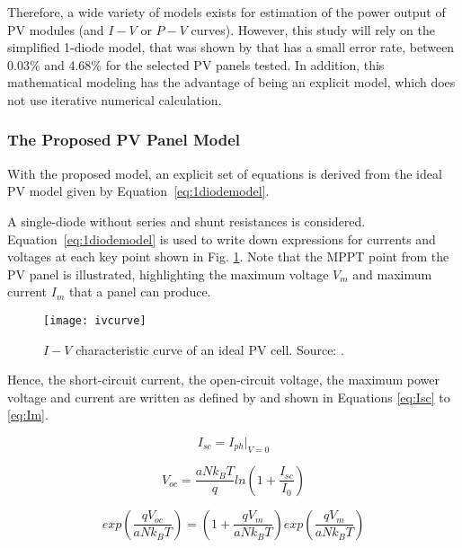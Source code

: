 Therefore, a wide variety of models exists for estimation of the power output of PV modules (and $I-V$ or $P-V$ curves). However, this study will rely on the simplified 1-diode model, that was shown by \cite{Saloux} that has a small error rate, between 0.03\% and 4.68\% for the selected PV panels tested. In addition, this mathematical modeling has the advantage of being an explicit model, which does not use iterative numerical calculation. 

\subsubsection{The Proposed PV Panel Model}

With the proposed model, an explicit set of equations is derived from the ideal PV model given by Equation~\ref{eq:1diodemodel}.

A single-diode without series and shunt resistances is considered. Equation~\ref{eq:1diodemodel} is used to write down expressions for currents and voltages at each key point shown in Fig. \ref{fig:ivcurve}. Note that the MPPT point from the PV panel is illustrated, highlighting the maximum voltage $ V_{m} $ and maximum current $ I_{m} $ that a panel can produce.

\begin{figure}[h]
\texttt{[image: ivcurve]}
\centering
\caption{$ I-V $ characteristic curve of an ideal PV cell. Source: \cite{Saloux}.}
\label{fig:ivcurve}
\end{figure}

Hence, the short-circuit current, the open-circuit voltage, the maximum power voltage and current are written as defined by \cite{Saloux} and shown in Equations \ref{eq:Isc} to \ref{eq:Im}.

\begin{equation}
\label{eq:Isc}
I_{sc}=I_{ph}\vert_{V=0}
\end{equation}

\begin{equation}
\label{eq:Voc}
V_{oc}=\dfrac{aNk_{B}T}{q}ln\left( 1+\dfrac{I_{sc}}{I_{0}} \right) 
\end{equation}

\begin{equation}
\label{eq:exp}
exp\left( \dfrac{qV_{oc}}{aNk_{B}T} \right) = \left(1+\dfrac{qV_{m}}{aNk_{B}T} \right) exp \left( \dfrac{qV_{m}}{aNk_{B}T} \right) 
\end{equation}

